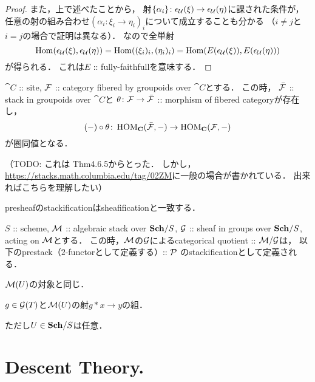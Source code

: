 \documentclass[a4paper, dvipdfmx]{jsarticle}
\newcommand{\HOM}{\operatorname{HOM}}
\begin{document}
\begin{proof}
    また，上で述べたことから，
    射$\{\alpha_i\} \colon \epsilon_{\mathcal{U}}(\xi) \to \epsilon_{\mathcal{U}}(\eta)$に課された条件が，
    任意の射の組み合わせ$(\alpha_i \colon \xi_i \to \eta_i)_i$について成立することも分かる
    （$i \neq j$と$i=j$の場合で証明は異なる）．
    なので全単射
    \[
        \operatorname{Hom}(\epsilon_{\mathcal{U}}(\xi), \epsilon_{\mathcal{U}}(\eta))
        =\operatorname{Hom}((\xi_i)_i, (\eta_i)_i)
        =\operatorname{Hom}(E(\epsilon_{\mathcal{U}}(\xi)), E(\epsilon_{\mathcal{U}}(\eta)))
    \]
    が得られる．
    これは$E$ :: fully-faithfullを意味する．
\end{proof}

\begin{Thm}
    $\cat{C}$ :: site,
    $\mathcal{F}$ :: category fibered by groupoids over $\cat{C}$とする．
    この時，
    $\bar{\mathcal{F}}$ :: stack in groupoids over $\cat{C}$と
    $\theta \colon \mathcal{F} \to \bar{\mathcal{F}}$ :: morphism of fibered categoryが存在し，
    \[ (-) \circ \theta \colon \HOM_{\cat{C}}(\bar{\stF}, -) \to \HOM_{\cat{C}}(\stF, -) \]
    が圏同値となる．
\end{Thm}
（TODO: これは\cite{ASS} Thm4.6.5からとった．
しかし，\url{https://stacks.math.columbia.edu/tag/02ZM}に一般の場合が書かれている．
出来ればこちらを理解したい）

\begin{Example}
    presheafのstackificationはsheafificationと一致する．
\end{Example}

\begin{Example}
    $S$ :: scheme,
    $\mathcal{M}$ :: algebraic stack over $\mathbf{Sch}/S$,
    $\mathcal{G}$ :: sheaf in groups over $\mathbf{Sch}/S$, acting on $\mathcal{M}$とする．
    この時，$\mathcal{M}$の$\mathcal{G}$によるcategorical quotient :: $\mathcal{M}/\mathcal{G}$は，
    以下のprestack（$2$-functorとして定義する）:: $\mathcal{P}$ のstackificationとして定義される．
    \begin{description}[labelindent=1cm]
        \item[Objects of $\shP(U)$.] $\mathcal{M}(U)$の対象と同じ．
        \item[Arrows of $\shP(U)$.]  $g \in \mathcal{G}(T)$と$\mathcal{M}(U)$の射$g \ast x \to y$の組．
    \end{description}
    ただし$U \in \mathbf{Sch}/S$は任意．
\end{Example}

\section{Descent Theory.}
\end{document}
